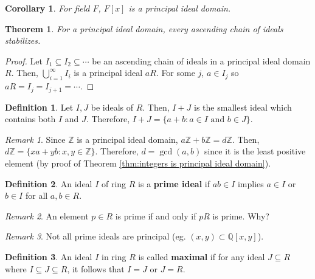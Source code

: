 \documentclass[parskip=half]{scrartcl}  %
\theoremstyle{definition}
\newtheorem{definition}{Definition}[section]
\theoremstyle{plain}
\newtheorem{theorem}{Theorem}[definition]
\newtheorem{corollary}{Corollary}[definition]
\theoremstyle{remark}
\newtheorem{remark}{Remark}[definition]
\begin{document}
\begin{corollary}
    For field $F$, $F[x]$ is a principal ideal domain.
\end{corollary}

\begin{theorem}
    For a principal ideal domain, every ascending chain of ideals stabilizes.
\end{theorem}

\begin{proof}
    Let $I_1\subseteq I_2\subseteq\cdots$ be an ascending chain of ideals in a
    principal ideal domain $R$.
    Then, $\bigcup_{i=1}^\infty I_i$ is a principal ideal $aR$.
    For some $j$, $a\in I_j$ so $aR=I_j=I_{j+1}=\cdots$.
\end{proof}

\begin{definition}
    Let $I,J$ be ideals of $R$. Then, $I+J$ is the smallest ideal which contains
    both $I$ and $J$.
    Therefore, $I+J=\{a+b:a\in I\text{ and }b\in J\}$.
\end{definition}

\begin{remark}
    Since $\mathbb{Z}$ is a principal ideal domain, $a\mathbb{Z}+b\mathbb{Z}=d\mathbb{Z}$.
    Then, $d\mathbb{Z}=\{xa+yb:x,y\in\mathbb{Z}\}$.
    Therefore, $d=\gcd(a,b)$ since it is the least positive element (by proof
    of Theorem \ref{thm:integers is principal ideal domain}).
\end{remark}

\begin{definition}
    An ideal $I$ of ring $R$ is a \textbf{prime ideal} if $ab\in I$ implies
    $a\in I$ or $b\in I$ for all $a,b\in R$.
\end{definition}

\begin{remark}
    An element $p\in R$ is prime if and only if $pR$ is prime.
    Why?
\end{remark}

\begin{remark}
    Not all prime ideals are principal (eg. $(x,y)\subset\mathbb{Q}[x,y]$).
\end{remark}

\begin{definition}
    An ideal $I$ in ring $R$ is called \textbf{maximal} if for any ideal
    $J\subseteq R$ where $I\subseteq J\subseteq R$, it follows that $I=J$ or
    $J=R$.
\end{definition}
\end{document}
